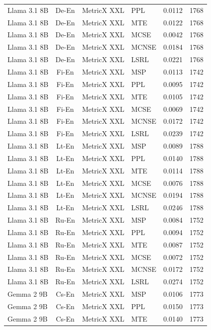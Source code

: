 \begin{table}
\begin{tabular}{lc}
Llama 3.1 8B & De-En & MetricX XXL & PPL & 0.0112 & 1768 \\
Llama 3.1 8B & De-En & MetricX XXL & MTE & 0.0122 & 1768 \\
Llama 3.1 8B & De-En & MetricX XXL & MCSE & 0.0042 & 1768 \\
Llama 3.1 8B & De-En & MetricX XXL & MCNSE & 0.0184 & 1768 \\
Llama 3.1 8B & De-En & MetricX XXL & LSRL & 0.0221 & 1768 \\
Llama 3.1 8B & Fi-En & MetricX XXL & MSP & 0.0113 & 1742 \\
Llama 3.1 8B & Fi-En & MetricX XXL & PPL & 0.0095 & 1742 \\
Llama 3.1 8B & Fi-En & MetricX XXL & MTE & 0.0105 & 1742 \\
Llama 3.1 8B & Fi-En & MetricX XXL & MCSE & 0.0069 & 1742 \\
Llama 3.1 8B & Fi-En & MetricX XXL & MCNSE & 0.0172 & 1742 \\
Llama 3.1 8B & Fi-En & MetricX XXL & LSRL & 0.0239 & 1742 \\
Llama 3.1 8B & Lt-En & MetricX XXL & MSP & 0.0089 & 1788 \\
Llama 3.1 8B & Lt-En & MetricX XXL & PPL & 0.0140 & 1788 \\
Llama 3.1 8B & Lt-En & MetricX XXL & MTE & 0.0114 & 1788 \\
Llama 3.1 8B & Lt-En & MetricX XXL & MCSE & 0.0076 & 1788 \\
Llama 3.1 8B & Lt-En & MetricX XXL & MCNSE & 0.0194 & 1788 \\
Llama 3.1 8B & Lt-En & MetricX XXL & LSRL & 0.0246 & 1788 \\
Llama 3.1 8B & Ru-En & MetricX XXL & MSP & 0.0084 & 1752 \\
Llama 3.1 8B & Ru-En & MetricX XXL & PPL & 0.0094 & 1752 \\
Llama 3.1 8B & Ru-En & MetricX XXL & MTE & 0.0087 & 1752 \\
Llama 3.1 8B & Ru-En & MetricX XXL & MCSE & 0.0072 & 1752 \\
Llama 3.1 8B & Ru-En & MetricX XXL & MCNSE & 0.0172 & 1752 \\
Llama 3.1 8B & Ru-En & MetricX XXL & LSRL & 0.0274 & 1752 \\
Gemma 2 9B & Cs-En & MetricX XXL & MSP & 0.0106 & 1773 \\
Gemma 2 9B & Cs-En & MetricX XXL & PPL & 0.0150 & 1773 \\
Gemma 2 9B & Cs-En & MetricX XXL & MTE & 0.0140 & 1773 \\

\end{tabular}
\end{table}
